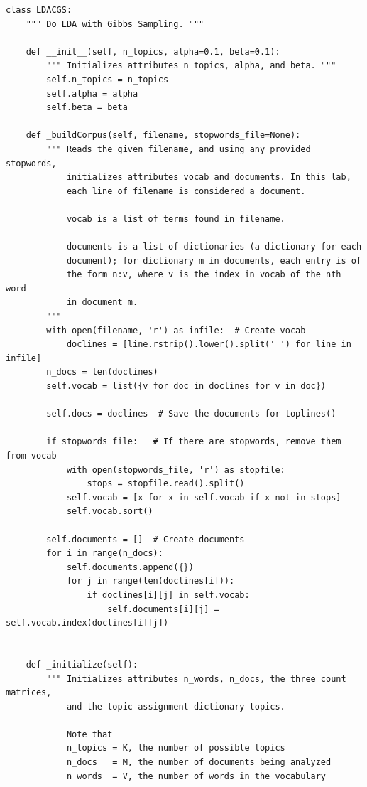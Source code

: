 \begin{lstlisting}
class LDACGS:
    """ Do LDA with Gibbs Sampling. """

    def __init__(self, n_topics, alpha=0.1, beta=0.1):
        """ Initializes attributes n_topics, alpha, and beta. """
        self.n_topics = n_topics
        self.alpha = alpha
        self.beta = beta

    def _buildCorpus(self, filename, stopwords_file=None):
        """ Reads the given filename, and using any provided stopwords,
            initializes attributes vocab and documents. In this lab,
            each line of filename is considered a document.
            
            vocab is a list of terms found in filename.
            
            documents is a list of dictionaries (a dictionary for each 
            document); for dictionary m in documents, each entry is of 
            the form n:v, where v is the index in vocab of the nth word 
            in document m.
        """
        with open(filename, 'r') as infile:  # Create vocab
            doclines = [line.rstrip().lower().split(' ') for line in infile]
        n_docs = len(doclines)
        self.vocab = list({v for doc in doclines for v in doc})

        self.docs = doclines  # Save the documents for toplines()

        if stopwords_file:   # If there are stopwords, remove them from vocab
            with open(stopwords_file, 'r') as stopfile:
                stops = stopfile.read().split()
            self.vocab = [x for x in self.vocab if x not in stops]
            self.vocab.sort()
        
        self.documents = []  # Create documents
        for i in range(n_docs):
            self.documents.append({})
            for j in range(len(doclines[i])):
                if doclines[i][j] in self.vocab:
                    self.documents[i][j] = self.vocab.index(doclines[i][j])


    def _initialize(self):
        """ Initializes attributes n_words, n_docs, the three count matrices, 
            and the topic assignment dictionary topics.
                        
            Note that
            n_topics = K, the number of possible topics
            n_docs   = M, the number of documents being analyzed
            n_words  = V, the number of words in the vocabulary
            

\end{lstlisting}
